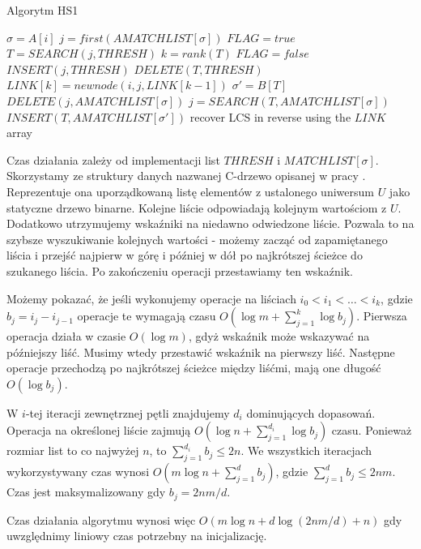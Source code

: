 \documentclass[11pt]{article}
\begin{document}
\begin{algorithm}
\caption{Algorytm HS1}\label{alg:hs1}
\begin{algorithmic}
    \State $\sigma = A[i]$
    \State $j = first(AMATCHLIST[\sigma])$
    \State $FLAG = true$
        \State $T = SEARCH(j, THRESH)$
        \State $k = rank(T)$
            \State $FLAG = false$
        \EndIf
        \State $INSERT(j, THRESH)$
        \State $DELETE(T, THRESH)$
        \State $LINK[k]=  newnode(i, j, LINK[k-1])$
        \State $\sigma' = B[T]$
        \State $DELETE(j, AMATCHLIST[\sigma])$
        \State $j = SEARCH(T, AMATCHLIST[\sigma])$
        \State $INSERT(T, AMATCHLIST[\sigma'])$
    \EndWhile
\EndFor
\State recover LCS in reverse using the $LINK$ array
\end{algorithmic}
\end{algorithm}

Czas działania zależy od implementacji list $THRESH$ i $MATCHLIST[\sigma]$. Skorzystamy ze struktury danych nazwanej C-drzewo opisanej w pracy \cite{apostolico1987longest}. Reprezentuje ona uporządkowaną listę elementów z ustalonego uniwersum $U$ jako statyczne drzewo binarne. Kolejne liście odpowiadają kolejnym wartościom z $U$. Dodatkowo utrzymujemy wskaźniki na niedawno odwiedzone liście. Pozwala to na szybsze wyszukiwanie kolejnych wartości - możemy zacząć od zapamiętanego liścia i przejść najpierw w górę i później w dół po najkrótszej ścieżce do szukanego liścia. Po zakończeniu operacji przestawiamy ten wskaźnik.

Możemy pokazać, że jeśli wykonujemy operacje na liściach $i_0 < i_1 < \dots < i_k$, gdzie $b_j = i_j - i_{j-1}$ operacje te wymagają czasu $O(\log{m} + \sum_{j=1}^k \log{b_j})$. Pierwsza operacja działa w czasie $O(\log{m})$, gdyż wskaźnik może wskazywać na późniejszy liść. Musimy wtedy przestawić wskaźnik na pierwszy liść. Następne operacje przechodzą po najkrótszej ścieżce między liśćmi, mają one długość $O(\log{b_j})$. 

W $i$-tej iteracji zewnętrznej pętli znajdujemy $d_i$ dominujących dopasowań. Operacja na określonej liście zajmują $O(\log{n} + \sum_{j=1}^{d_i} \log{b_j})$ czasu. Ponieważ rozmiar list to co najwyżej $n$, to $\sum_{j=1}^{d_i} b_j \le 2n$. We wszystkich iteracjach wykorzystywany czas wynosi $O(m\log{n} + \sum_{j=1}^d b_j)$, gdzie $\sum_{j=1}^d b_j \le 2nm$. Czas jest maksymalizowany gdy $b_j = 2nm/d$. 

Czas działania algorytmu wynosi więc $O(m\log{n} + d\log{(2nm/d)} + n)$ gdy uwzględnimy liniowy czas potrzebny na inicjalizację. 



\end{document}
